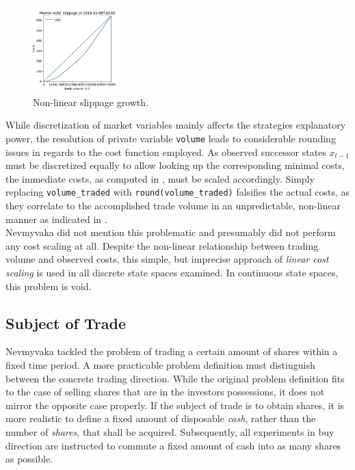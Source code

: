 \begin{figure}
	\centering
	\includegraphics[width=0.3\textwidth,trim={0 0.2cm 0 0.7cm},clip]{content/drawings/nonlinearcosts}
	\caption{Non-linear slippage growth.}
	\label{fig:nonlinearcosts}
\end{figure}

While discretization of market variables mainly affects the strategies explanatory power, the resolution of private variable \lstinline!volume! leads to considerable rounding issues in regards to the cost function employed. As observed successor states $x_{t-1}$ must be discretized equally to allow looking up the corresponding minimal costs, the immediate costs, as computed in , must be scaled accordingly. Simply replacing \lstinline!volume_traded! with \lstinline!round(volume_traded)! falsifies the actual costs, as they correlate to the accomplished trade volume in an unpredictable, non-linear manner as indicated in .\\

Nevmyvaka \etal \Cite{Nevmyvaka:2006} did not mention this problematic and presumably did not perform any cost scaling at all. Despite the non-linear relationship between trading volume and observed costs, this simple, but imprecise approach of \emph{linear cost scaling} is used in all discrete state spaces examined. In continuous state spaces, this problem is void.

\subsection{Subject of Trade}
\label{chap:backwardalgorithm:discussion:subjectTrade}
Nevmyvaka \etal \cite{Nevmyvaka:2006} tackled the problem of trading a certain amount of shares within a fixed time period. A more practicable problem definition must distinguish between the concrete trading direction. While the original problem definition fits to the case of selling shares that are in the investors possessions, it does not mirror the opposite case properly. If the subject of trade is to obtain shares, it is more realistic to define a fixed amount of disposable \emph{cash}, rather than the number of \emph{shares}, that shall be acquired. Subsequently, all experiments in buy direction are instructed to commute a fixed amount of cash into as many shares as possible.\\
 
